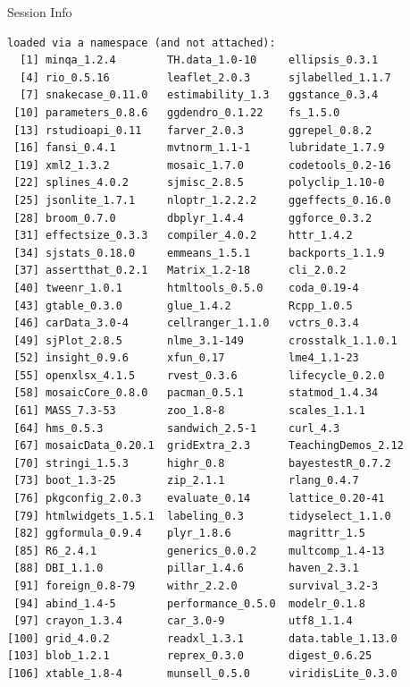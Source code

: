 \documentclass[10pt]{beamer}\usepackage[]{graphicx}\usepackage[]{color}
\makeatletter
\newenvironment{kframe}{%
 \def\at@end@of@kframe{}%
 \ifinner\ifhmode%
  \def\at@end@of@kframe{\end{minipage}}%
  \begin{minipage}{\columnwidth}%
 \fi\fi%
 \def\FrameCommand##1{\hskip\@totalleftmargin \hskip-\fboxsep
 \colorbox{shadecolor}{##1}\hskip-\fboxsep
     \hskip-\linewidth \hskip-\@totalleftmargin \hskip\columnwidth}%
 \MakeFramed {\advance\hsize-\width
   \@totalleftmargin\z@ \linewidth\hsize
   \@setminipage}}%
 {\par\unskip\endMakeFramed%
 \at@end@of@kframe}
\newenvironment{knitrout}{}{} %
\makeatother
\begin{document}
\begin{frame}[fragile]{Session Info}
\begin{knitrout}
\begin{kframe}
\begin{verbatim}
loaded via a namespace (and not attached):
  [1] minqa_1.2.4        TH.data_1.0-10     ellipsis_0.3.1    
  [4] rio_0.5.16         leaflet_2.0.3      sjlabelled_1.1.7  
  [7] snakecase_0.11.0   estimability_1.3   ggstance_0.3.4    
 [10] parameters_0.8.6   ggdendro_0.1.22    fs_1.5.0          
 [13] rstudioapi_0.11    farver_2.0.3       ggrepel_0.8.2     
 [16] fansi_0.4.1        mvtnorm_1.1-1      lubridate_1.7.9   
 [19] xml2_1.3.2         mosaic_1.7.0       codetools_0.2-16  
 [22] splines_4.0.2      sjmisc_2.8.5       polyclip_1.10-0   
 [25] jsonlite_1.7.1     nloptr_1.2.2.2     ggeffects_0.16.0  
 [28] broom_0.7.0        dbplyr_1.4.4       ggforce_0.3.2     
 [31] effectsize_0.3.3   compiler_4.0.2     httr_1.4.2        
 [34] sjstats_0.18.0     emmeans_1.5.1      backports_1.1.9   
 [37] assertthat_0.2.1   Matrix_1.2-18      cli_2.0.2         
 [40] tweenr_1.0.1       htmltools_0.5.0    coda_0.19-4       
 [43] gtable_0.3.0       glue_1.4.2         Rcpp_1.0.5        
 [46] carData_3.0-4      cellranger_1.1.0   vctrs_0.3.4       
 [49] sjPlot_2.8.5       nlme_3.1-149       crosstalk_1.1.0.1 
 [52] insight_0.9.6      xfun_0.17          lme4_1.1-23       
 [55] openxlsx_4.1.5     rvest_0.3.6        lifecycle_0.2.0   
 [58] mosaicCore_0.8.0   pacman_0.5.1       statmod_1.4.34    
 [61] MASS_7.3-53        zoo_1.8-8          scales_1.1.1      
 [64] hms_0.5.3          sandwich_2.5-1     curl_4.3          
 [67] mosaicData_0.20.1  gridExtra_2.3      TeachingDemos_2.12
 [70] stringi_1.5.3      highr_0.8          bayestestR_0.7.2  
 [73] boot_1.3-25        zip_2.1.1          rlang_0.4.7       
 [76] pkgconfig_2.0.3    evaluate_0.14      lattice_0.20-41   
 [79] htmlwidgets_1.5.1  labeling_0.3       tidyselect_1.1.0  
 [82] ggformula_0.9.4    plyr_1.8.6         magrittr_1.5      
 [85] R6_2.4.1           generics_0.0.2     multcomp_1.4-13   
 [88] DBI_1.1.0          pillar_1.4.6       haven_2.3.1       
 [91] foreign_0.8-79     withr_2.2.0        survival_3.2-3    
 [94] abind_1.4-5        performance_0.5.0  modelr_0.1.8      
 [97] crayon_1.3.4       car_3.0-9          utf8_1.1.4        
[100] grid_4.0.2         readxl_1.3.1       data.table_1.13.0 
[103] blob_1.2.1         reprex_0.3.0       digest_0.6.25     
[106] xtable_1.8-4       munsell_0.5.0      viridisLite_0.3.0 
\end{verbatim}
\end{kframe}
\end{knitrout}
	
\end{frame}
\end{document}
